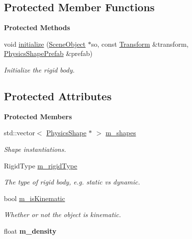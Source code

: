 \subsection*{Protected Member Functions}
\begin{Indent}\textbf{ Protected Methods}\par
\begin{DoxyCompactItemize}
\item 
\mbox{\label{classrev_1_1_rigid_body_a170b875823ee4396dad15b13d4336101}} 
void \mbox{\hyperlink{classrev_1_1_rigid_body_a170b875823ee4396dad15b13d4336101}{initialize}} (\mbox{\hyperlink{classrev_1_1_scene_object}{Scene\+Object}} $\ast$so, const \mbox{\hyperlink{classrev_1_1_transform}{Transform}} \&transform, \mbox{\hyperlink{classrev_1_1_physics_shape_prefab}{Physics\+Shape\+Prefab}} \&prefab)
\begin{DoxyCompactList}\small\item\em Initialize the rigid body. \end{DoxyCompactList}\end{DoxyCompactItemize}
\end{Indent}
\subsection*{Protected Attributes}
\begin{Indent}\textbf{ Protected Members}\par
\begin{DoxyCompactItemize}
\item 
std\+::vector$<$ \mbox{\hyperlink{classrev_1_1_physics_shape}{Physics\+Shape}} $\ast$ $>$ \mbox{\hyperlink{classrev_1_1_rigid_body_a59adf3ade36187d693f121ea7f59af9b}{m\+\_\+shapes}}
\begin{DoxyCompactList}\small\item\em Shape instantiations. \end{DoxyCompactList}\item 
\mbox{\label{classrev_1_1_rigid_body_a7c80c64052b504ccde0d8d0c9d8fa7fa}} 
Rigid\+Type \mbox{\hyperlink{classrev_1_1_rigid_body_a7c80c64052b504ccde0d8d0c9d8fa7fa}{m\+\_\+rigid\+Type}}
\begin{DoxyCompactList}\small\item\em The type of rigid body, e.\+g. static vs dynamic. \end{DoxyCompactList}\item 
bool \mbox{\hyperlink{classrev_1_1_rigid_body_a8e4d45b9d3506659d760acf25774eea9}{m\+\_\+is\+Kinematic}}
\begin{DoxyCompactList}\small\item\em Whether or not the object is kinematic. \end{DoxyCompactList}\item 
\mbox{\label{classrev_1_1_rigid_body_a4768b80f1754e9c3d5b1a71612cfe706}} 
float {\bfseries m\+\_\+density}
\end{DoxyCompactItemize}
\end{Indent}
